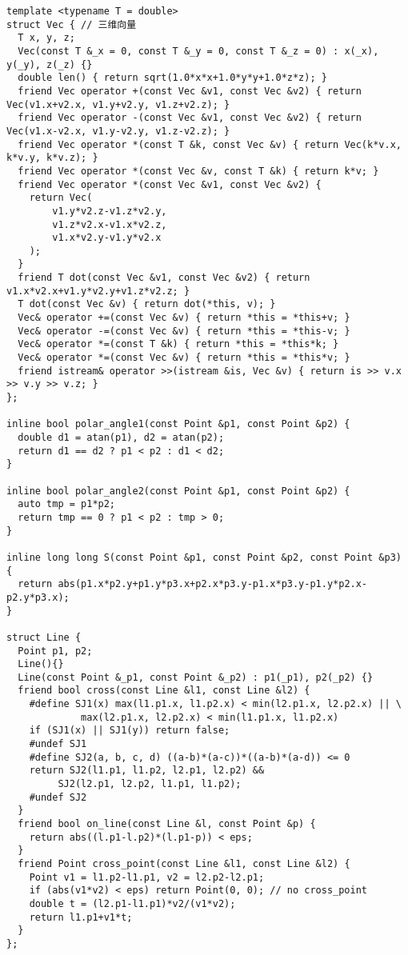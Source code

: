 \documentclass[12pt]{article}
\begin{document}
{{{{{{{{{{{\begin{lstlisting}
template <typename T = double>
struct Vec { // 三维向量
  T x, y, z;
  Vec(const T &_x = 0, const T &_y = 0, const T &_z = 0) : x(_x), y(_y), z(_z) {}
  double len() { return sqrt(1.0*x*x+1.0*y*y+1.0*z*z); }
  friend Vec operator +(const Vec &v1, const Vec &v2) { return Vec(v1.x+v2.x, v1.y+v2.y, v1.z+v2.z); }
  friend Vec operator -(const Vec &v1, const Vec &v2) { return Vec(v1.x-v2.x, v1.y-v2.y, v1.z-v2.z); }
  friend Vec operator *(const T &k, const Vec &v) { return Vec(k*v.x, k*v.y, k*v.z); }
  friend Vec operator *(const Vec &v, const T &k) { return k*v; }
  friend Vec operator *(const Vec &v1, const Vec &v2) {
    return Vec(
        v1.y*v2.z-v1.z*v2.y,
        v1.z*v2.x-v1.x*v2.z,
        v1.x*v2.y-v1.y*v2.x
    );
  }
  friend T dot(const Vec &v1, const Vec &v2) { return v1.x*v2.x+v1.y*v2.y+v1.z*v2.z; }
  T dot(const Vec &v) { return dot(*this, v); }
  Vec& operator +=(const Vec &v) { return *this = *this+v; }
  Vec& operator -=(const Vec &v) { return *this = *this-v; }
  Vec& operator *=(const T &k) { return *this = *this*k; }
  Vec& operator *=(const Vec &v) { return *this = *this*v; }
  friend istream& operator >>(istream &is, Vec &v) { return is >> v.x >> v.y >> v.z; }
};

inline bool polar_angle1(const Point &p1, const Point &p2) {
  double d1 = atan(p1), d2 = atan(p2); 
  return d1 == d2 ? p1 < p2 : d1 < d2;
}

inline bool polar_angle2(const Point &p1, const Point &p2) {
  auto tmp = p1*p2;
  return tmp == 0 ? p1 < p2 : tmp > 0;
}

inline long long S(const Point &p1, const Point &p2, const Point &p3) {
  return abs(p1.x*p2.y+p1.y*p3.x+p2.x*p3.y-p1.x*p3.y-p1.y*p2.x-p2.y*p3.x);
}

struct Line {
  Point p1, p2;
  Line(){}
  Line(const Point &_p1, const Point &_p2) : p1(_p1), p2(_p2) {}
  friend bool cross(const Line &l1, const Line &l2) {
    #define SJ1(x) max(l1.p1.x, l1.p2.x) < min(l2.p1.x, l2.p2.x) || \
             max(l2.p1.x, l2.p2.x) < min(l1.p1.x, l1.p2.x)
    if (SJ1(x) || SJ1(y)) return false;
    #undef SJ1
    #define SJ2(a, b, c, d) ((a-b)*(a-c))*((a-b)*(a-d)) <= 0
    return SJ2(l1.p1, l1.p2, l2.p1, l2.p2) &&
         SJ2(l2.p1, l2.p2, l1.p1, l1.p2);
    #undef SJ2
  }
  friend bool on_line(const Line &l, const Point &p) {
    return abs((l.p1-l.p2)*(l.p1-p)) < eps;
  }
  friend Point cross_point(const Line &l1, const Line &l2) {
    Point v1 = l1.p2-l1.p1, v2 = l2.p2-l2.p1;
    if (abs(v1*v2) < eps) return Point(0, 0); // no cross_point
    double t = (l2.p1-l1.p1)*v2/(v1*v2);
    return l1.p1+v1*t;
  }
};


\end{lstlisting}}}}}}}}}}}}
\end{document}
